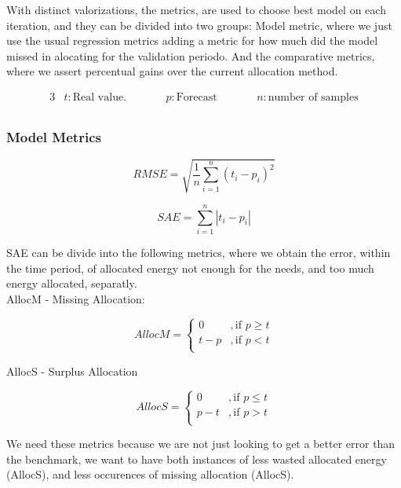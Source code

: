 
With distinct valorizations, the metrics, are used to choose best model on each iteration, and they can be divided into two groups:
Model metric, where we just use the usual regression metrics adding a metric for how much did the model missed in alocating for the validation periodo. And the comparative metrics, where we assert percentual gains over the current allocation method. \par 
\begin{alignat*}{3} 
& t : \text{Real value.} &\qquad& p : \text{Forecast} &\qquad& n : \text{number of samples} \\
\end{alignat*}


\subsubsection{Model Metrics}
\begin{linenomath}
    \begin{equation}\label{eq:rmse}
        RMSE = \sqrt{\frac{1}{n} \sum_{i=1}^{n}(t_i - p_i)^2}
    \end{equation}
    \end{linenomath}

\begin{linenomath}
    \begin{equation}\label{eq:SAE}
        SAE = \sum_{i=1}^{n}\left|t_i - p_i \right|
    \end{equation}
    \end{linenomath}
SAE can be divide into the following metrics, where we obtain the error, within the time period, of allocated energy not enough for the needs, and too much energy allocated, separatly.\\
AllocM - Missing Allocation: \\
\begin{linenomath}
    \begin{equation}\label{eq:AllocM}
        AllocM = 
        \begin{cases} 
            0 & , \text{if } p \geq t \\
            t - p  & , \text{if } p < t \\
        \end{cases} 
        \end{equation}
    \end{linenomath}
AllocS - Surplus Allocation \\
\begin{linenomath}
    \begin{equation}\label{eq:AllocS}
        AllocS = 
        \begin{cases} 
            0 & , \text{if } p \leq t \\
            p - t  & , \text{if } p > t \\
        \end{cases} 
            \end{equation}
    \end{linenomath}
We need these metrics because we are not just looking to get a better error than the benchmark, we want to have both instances of less wasted allocated energy (AllocS), and less occurences of missing allocation (AllocS).\par


